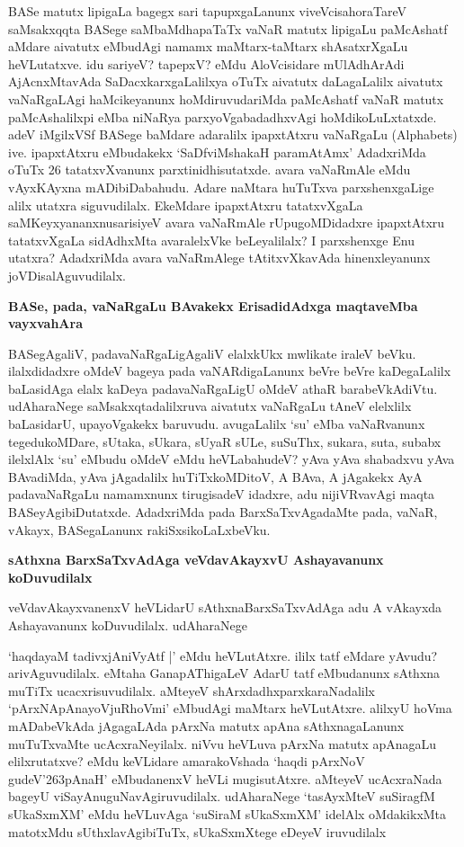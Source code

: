 \noindent
BASe matutx lipigaLa bagegx sari tapupxgaLanunx viveVcisahoraTareV saMsakxqqta BASege saMbaMdhapaTaTx vaNaR matutx lipigaLu paMcAshatf aMdare aivatutx eMbudAgi namamx maMtarx-taMtarx shAsatxrXgaLu heVLutatxve. idu sariyeV? tapepxV? eMdu AloVcisidare mUlAdhArAdi AjAcnxMtavAda SaDacxkarxgaLalilxya oTuTx aivatutx daLagaLalilx aivatutx vaNaRgaLAgi haMcikeyanunx hoMdiruvudariMda paMcAshatf vaNaR matutx paMcAshalilxpi eMba niNaRya parxyoVgabadadhxvAgi hoMdikoLuLxtatxde. adeV iMgilxVSf BASege baMdare adaralilx ipapx\-tAtxru vaNaRgaLu {\rm (Alphabets)} ive. ipapxtAtxru eMbudakekx `SaDfviMshakaH paramAtAmx' AdadxriMda oTuTx 26 tatatxvXvanunx parxtinidhisutatxde. avara vaNaRmAle eMdu vAyxKAyxna mADibiDabahudu. Adare naMtara huTuTxva parxshenxgaLige alilx utatxra siguvudilalx. EkeMdare ipapxtAtxru tatatxvXgaLa saMKeyxyananxnusarisiyeV avara vaNaRmAle rUpugoMDidadxre ipapxtAtxru tatatxvXgaLa sidAdhxMta avaralelxVke beLeyalilalx? I parxshenxge Enu utatxra? AdadxriMda avara vaNaRmAlege tAtitxvXkavAda hinenxleyanunx joVDisalAguvudilalx.

{\bigskip
\noindent
{\large\bf BASe, pada, vaNaRgaLu BAvakekx ErisadidAdxga maqtaveMba vayxvahAra}}\label{page185}
\medskip

\noindent
BASegAgaliV, padavaNaRgaLigAgaliV elalxkUkx mwlikate iraleV beVku. ilalxdidadxre oMdeV bageya pada vaNARdigaLanunx beVre beVre kaDegaLalilx baLasidAga elalx kaDeya padavaNaRgaLigU oMdeV athaR barabeVkAdiVtu. udAharaNege saMsakxqtadalilxruva aivatutx vaNaRgaLu tAneV elelxlilx baLasidarU, upa\-yoVgakekx baruvudu. avugaLalilx `su' eMba vaNaRvanunx tegedukoMDare, sUtaka, sUkara, sUyaR sULe, suSuThx, sukara, suta, subabx ilelxlAlx `su' eMbudu oMdeV eMdu heVLabahudeV? yAva yAva shabadxvu yAva BAvadiMda, yAva jAgadalilx huTiTxkoMDitoV, A BAva, A jAgakekx AyA padavaNaR\-gaLu namamxnunx tirugisadeV idadxre, adu nijiVRvavAgi maqta BASeyAgibiDutatxde. AdadxriMda pada BarxSaTx\-vAgadaMte pada, vaNaR, vAkayx, BASegaLanunx rakiSxsikoLaLxbeVku.


{\bigskip
\noindent
{\large\bf sAthxna BarxSaTxvAdAga veVdavAkayxvU Ashayavanunx koDuvudilalx}}\label{page186}
\medskip

\noindent
veVdavAkayxvanenxV heVLidarU sAthxnaBarxSaTxvAdAga adu A vAkayxda Ashayavanunx koDuvudilalx. udA\-haraNege

`haqdayaM tadivxjAniVyAtf |'\label{186} eMdu heVLutAtxre. ililx tatf eMdare yAvudu? arivAguvu\-dilalx. eMtaha GanapAThigaLeV AdarU tatf eMbudanunx sAthxna muTiTx ucacxrisuvudilalx. aMteyeV shArxdadhx\-parxkaraNadalilx `pArxNApAnayoVjuRhoVmi'\label{186} eMbudAgi maMtarx heVLutAtxre. alilxyU hoVma mADa\-beVkAda jAgagaLAda pArxNa matutx apAna sAthxnagaLanunx muTuTxvaMte ucAcxraNeyilalx. niVvu heVLuva pArxNa matutx apAnagaLu elilxrutatxve? eMdu keVLidare amarakoVshada `haqdi pArxNoV gudeV\char'263pAnaH' eMbu\-danenxV heVLi mugisutAtxre. aMteyeV ucAcxraNada bageyU viSayAnuguNavAgiruvudilalx. udA\-haraNege `tasAyxMteV suSiragfM sUkaSxmXM'\label{124} eMdu heVLuvAga `suSiraM sUkaSxmXM' idelAlx oMdakikxMta \-matotxMdu sUthxlavAgibiTuTx, sUkaSxmXtege eDeyeV iruvudilalx

